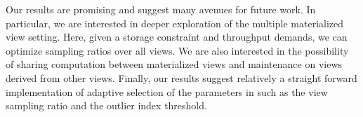 \iffalse
We evaluated our approach on real and synthetic datasets.
We use the TPCD benchmark to illustrate three common use cases of materialized views: joins, data-cube aggregates, and nested queries.
We also evaluated our approach on an industrial dataset from Conviva, where we demonstrated similar performance and accuracy.
We simulated a real deployment where we integrate \svc with periodic maintenance, and showed that \svc can exploit idle times in the system to give more accurate query results.
\fi

Our results are promising and suggest many avenues for future work.
In particular, we are interested in deeper exploration of the multiple materialized view setting.
Here, given a storage constraint and throughput demands, we can optimize sampling ratios over all views.
We are also interested in the possibility of sharing computation between materialized views and maintenance on views derived from other views.
Finally, our results suggest relatively a straight forward implementation of adaptive selection of the parameters in \svc such as the view sampling ratio and the outlier index threshold.




